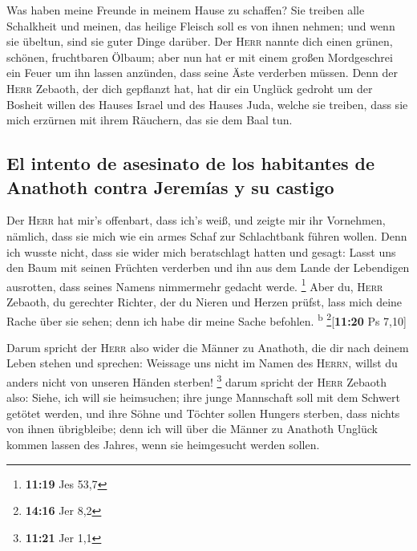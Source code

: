  Was haben meine Freunde in meinem Hause zu schaffen? Sie
treiben alle Schalkheit und meinen, das heilige Fleisch soll es von
ihnen nehmen; und wenn sie übeltun, sind sie guter Dinge darüber.
 Der \textsc{Herr} nannte dich einen grünen, schönen,
fruchtbaren Ölbaum; aber nun hat er mit einem großen Mordgeschrei ein
Feuer um ihn lassen anzünden, dass seine Äste verderben müssen.
 Denn der \textsc{Herr} Zebaoth, der dich gepflanzt hat,
hat dir ein Unglück gedroht um der Bosheit willen des Hauses Israel und
des Hauses Juda, welche sie treiben, dass sie mich erzürnen mit ihrem
Räuchern, das sie dem Baal tun.

\hypertarget{el-intento-de-asesinato-de-los-habitantes-de-anathoth-contra-jeremuxedas-y-su-castigo}{%
\subsection{El intento de asesinato de los habitantes de Anathoth contra
Jeremías y su
castigo}\label{el-intento-de-asesinato-de-los-habitantes-de-anathoth-contra-jeremuxedas-y-su-castigo}}

 Der \textsc{Herr} hat mir's offenbart, dass ich's weiß,
und zeigte mir ihr Vornehmen,  nämlich, dass sie mich wie
ein armes Schaf zur Schlachtbank führen wollen. Denn ich wusste nicht,
dass sie wider mich beratschlagt hatten und gesagt: Lasst uns den Baum
mit seinen Früchten verderben und ihn aus dem Lande der Lebendigen
ausrotten, dass seines Namens nimmermehr gedacht werde. \footnote{\textbf{11:19}
  Jes 53,7}  Aber du, \textsc{Herr} Zebaoth, du gerechter
Richter, der du Nieren und Herzen prüfst, lass mich deine Rache über sie
sehen; denn ich habe dir meine Sache befohlen. \textsuperscript{b}
\footnote{\textbf{14:16} Jer 8,2}{[}\textbf{11:20} Ps 7,10{]}

 Darum spricht der \textsc{Herr} also wider die Männer zu
Anathoth, die dir nach deinem Leben stehen und sprechen: Weissage uns
nicht im Namen des \textsc{Herrn}, willst du anders nicht von unseren
Händen sterben! \footnote{\textbf{11:21} Jer 1,1}  darum
spricht der \textsc{Herr} Zebaoth also: Siehe, ich will sie heimsuchen;
ihre junge Mannschaft soll mit dem Schwert getötet werden, und ihre
Söhne und Töchter sollen Hungers sterben, dass nichts von ihnen
übrigbleibe;  denn ich will über die Männer zu Anathoth
Unglück kommen lassen des Jahres, wenn sie heimgesucht werden sollen.

